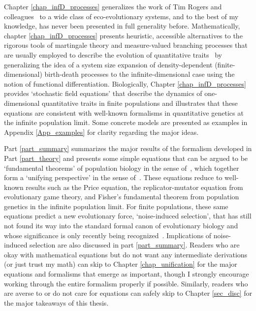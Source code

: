 Chapter \ref{chap_infD_processes} generalizes the work of Tim Rogers and colleagues~\citep{rogers_demographic_2012,rogers_spontaneous_2012,rogers_modes_2015} to a wide class of eco-evolutionary systems, and to the best of my knowledge, has never been presented in full generality before. Mathematically, chapter \ref{chap_infD_processes} presents heuristic, accessible alternatives to the rigorous tools of martingale theory and measure-valued branching processes that are usually employed to describe the evolution of quantitative traits~\citep{champagnat_unifying_2006,etheridge_mathematical_2011, week_white_2021} by generalizing the idea of a system size expansion of density-dependent (finite-dimensional) birth-death processes to the infinite-dimensional case using the notion of functional differentiation. Biologically, Chapter \ref{chap_infD_processes} provides `stochastic field equations' that describe the dynamics of one-dimensional quantitative traits in finite populations and illustrates that these equations are consistent with well-known formalisms in quantitative genetics at the infinite population limit. Some concrete models are presented as examples in Appendix \ref{App_examples} for clarity regarding the major ideas.

Part \ref{part_summary} summarizes the major results of the formalism developed in Part \ref{part_theory} and presents some simple equations that can be argued to be `fundamental theorems' of population biology in the sense of~\cite{queller_fundamental_2017}, which together form a `unifying perspective' in the sense of~\cite{lion_theoretical_2018}. These equations reduce to well-known results such as the Price equation, the replicator-mutator equation from evolutionary game theory, and Fisher's fundamental theorem from population genetics in the infinite population limit. For finite populations, these same equations predict a new evolutionary force, `noise-induced selection', that has still not found its way into the standard formal canon of evolutionary biology and whose significance is only recently being recognized~\citep{constable_demographic_2016,mcleod_social_2019,mazzolini_universality_2022, kuosmanen_turnover_2022}. Implications of noise-induced selection are also discussed in part \ref{part_summary}. Readers who are okay with mathematical equations but do not want any intermediate derivations (or just trust my math) can skip to Chapter \ref{chap_unification} for the major equations and formalisms that emerge as important, though I strongly encourage working through the entire formalism properly if possible. Similarly, readers who are averse to or do not care for equations can safely skip to Chapter \ref{sec_disc} for the major takeaways of this thesis.

